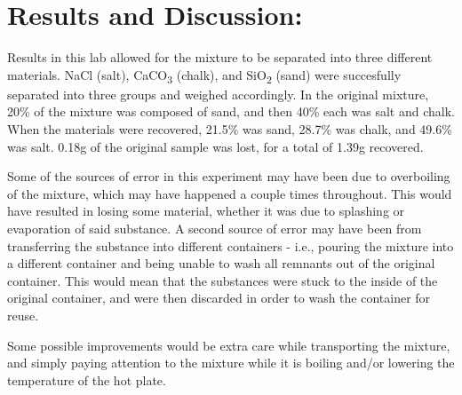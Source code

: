 \documentclass{article}
\begin{document}
  \section*{Results and Discussion:}

  Results in this lab allowed for the mixture to be separated into three different materials.
  NaCl (salt), CaCO\textsubscript{3} (chalk), and SiO\textsubscript{2} (sand) were succesfully separated into three groups and
  weighed accordingly. In the original mixture, 20\% of the mixture was composed of sand, and then 40\%
  each was salt and chalk. When the materials were recovered, 21.5\% was sand, 28.7\% was chalk, and
  49.6\% was salt. 0.18g of the original sample was lost, for a total of 1.39g recovered.

  Some of the sources of error in this experiment may have been due to overboiling of the mixture,
  which may have happened a couple times throughout. This would have resulted in losing some material,
  whether it was due to splashing or evaporation of said substance. A second source of error may have
  been from transferring the substance into different containers - i.e., pouring the mixture into a
  different container and being unable to wash all remnants out of the original container. This would
  mean that the substances were stuck to the inside of the original container, and were then discarded
  in order to wash the container for reuse.

  Some possible improvements would be extra care while transporting the mixture, and simply paying attention
  to the mixture while it is boiling and/or lowering the temperature of the hot plate.
\end{document}

